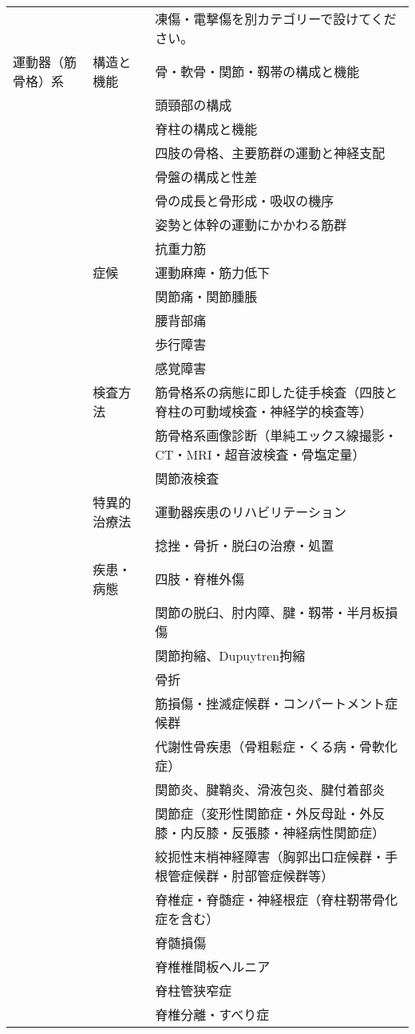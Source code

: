 \documentclass[
]{ltjsarticle}
\begin{document}
\begin{xltabular}{\linewidth}{XXX}
 &  & 凍傷・電撃傷を別カテゴリーで設けてください。 \\
運動器（筋骨格）系 & 構造と機能 & 骨・軟骨・関節・靱帯の構成と機能 \\
 &  & 頭頸部の構成 \\
 &  & 脊柱の構成と機能 \\
 &  & 四肢の骨格、主要筋群の運動と神経支配 \\
 &  & 骨盤の構成と性差 \\
 &  & 骨の成長と骨形成・吸収の機序 \\
 &  & 姿勢と体幹の運動にかかわる筋群 \\
 &  & 抗重力筋 \\
 & 症候 & 運動麻痺・筋力低下 \\
 &  & 関節痛・関節腫脹 \\
 &  & 腰背部痛 \\
 &  & 歩行障害 \\
 &  & 感覚障害 \\
 & 検査方法 & 筋骨格系の病態に即した徒手検査（四肢と脊柱の可動域検査・神経学的検査等） \\
 &  & 筋骨格系画像診断（単純エックス線撮影・CT・MRI・超音波検査・骨塩定量） \\
 &  & 関節液検査 \\
 & 特異的治療法 & 運動器疾患のリハビリテーション \\
 &  & 捻挫・骨折・脱臼の治療・処置 \\
 & 疾患・病態 & 四肢・脊椎外傷 \\
 &  & 関節の脱臼、肘内障、腱・靱帯・半月板損傷 \\
 &  & 関節拘縮、Dupuytren拘縮 \\
 &  & 骨折 \\
 &  & 筋損傷・挫滅症候群・コンパートメント症候群 \\
 &  & 代謝性骨疾患（骨粗鬆症・くる病・骨軟化症） \\
 &  & 関節炎、腱鞘炎、滑液包炎、腱付着部炎 \\
 &  & 関節症（変形性関節症・外反母趾・外反膝・内反膝・反張膝・神経病性関節症） \\
 &  & 絞扼性末梢神経障害（胸郭出口症候群・手根管症候群・肘部管症候群等） \\
 &  & 脊椎症・脊髄症・神経根症（脊柱靭帯骨化症を含む） \\
 &  & 脊髄損傷 \\
 &  & 脊椎椎間板ヘルニア \\
 &  & 脊柱管狭窄症 \\
 &  & 脊椎分離・すべり症 \\

\end{xltabular}
\end{document}
